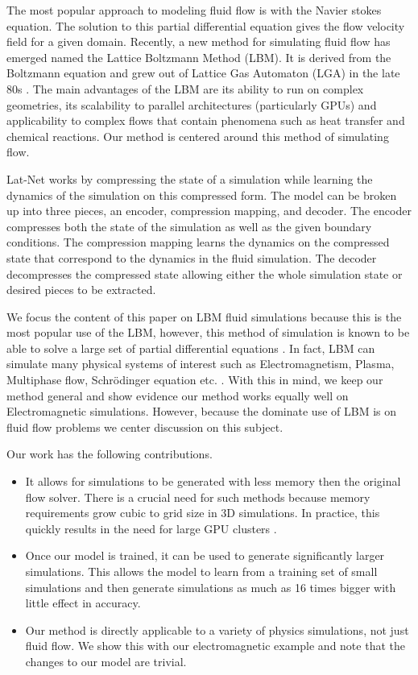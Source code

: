 \documentclass{article}
\begin{document}
The most popular approach to modeling fluid flow is with the Navier stokes equation. The solution to this partial differential equation gives the flow velocity field for a given domain. Recently, a new method for simulating fluid flow has emerged named the Lattice Boltzmann Method (LBM). It is derived from the Boltzmann equation and grew out of Lattice Gas Automaton (LGA) in the late 80s \cite{mcnamara1988use}. The main advantages of the LBM are its ability to run on complex geometries, its scalability to parallel architectures (particularly GPUs) and applicability to complex flows that contain phenomena such as heat transfer and chemical reactions. Our method is centered around this method of simulating flow.

Lat-Net works by compressing the state of a simulation while learning the dynamics of the simulation on this compressed form. The model can be broken up into three pieces, an encoder, compression mapping, and decoder. The encoder compresses both the state of the simulation as well as the given boundary conditions. The compression mapping learns the dynamics on the compressed state that correspond to the dynamics in the fluid simulation. The decoder decompresses the compressed state allowing either the whole simulation state or desired pieces to be extracted.

We focus the content of this paper on LBM fluid simulations because this is the most popular use of the LBM, however, this method of simulation is known to be able to solve a large set of partial differential equations \cite{galindolattice}. In fact, LBM can simulate many physical systems of interest such as Electromagnetism, Plasma, Multiphase flow, Schrödinger equation etc. \cite{mendoza2010three} \cite{kim2008wavelet} \cite{zhong2006lattice} \cite{shan1993lattice}. With this in mind, we keep our method general and show evidence our method works equally well on Electromagnetic simulations. However, because the dominate use of LBM is on fluid flow problems we center discussion on this subject.

Our work has the following contributions.
\begin{itemize}
  \item It allows for simulations to be generated with less memory then the original flow solver. There is a crucial need for such methods because memory requirements grow cubic to grid size in 3D simulations. In practice, this quickly results in the need for large GPU clusters \cite{onodera2013large} \cite{xian2011multi}.
  \item Once our model is trained, it can be used to generate significantly larger simulations. This allows the model to learn from a training set of small simulations and then generate simulations as much as 16 times bigger with little effect in accuracy.
  \item Our method is directly applicable to a variety of physics simulations, not just fluid flow. We show this with our electromagnetic example and note that the changes to our model are trivial.
\end{itemize}
\end{document}
